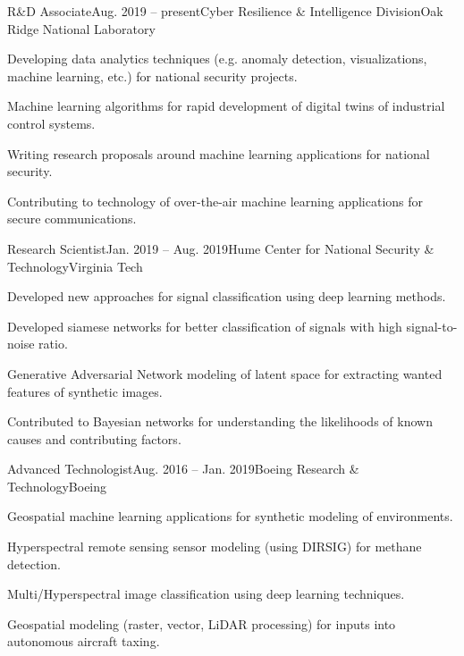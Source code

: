 \documentclass{tidycv} %
\begin{document}
\begin{cvresearches}
\begin{cvresearch}{R{\&}D Associate}{Aug. 2019 -- present}{Cyber Resilience \& Intelligence Division}{Oak Ridge National Laboratory}
 \item Developing data analytics techniques (e.g. anomaly detection, visualizations, machine learning, etc.) for national security projects.
 \item Machine learning algorithms for rapid development of digital twins of industrial control systems.
 \item Writing research proposals around machine learning applications for national security.
 \item Contributing to technology of over-the-air machine learning applications for secure communications. 
\end{cvresearch}
\begin{cvresearch}{Research Scientist}{Jan. 2019 -- Aug. 2019}{Hume Center for National Security \& Technology}{Virginia Tech}
 \item Developed new approaches for signal classification using deep learning methods. 
 \item Developed siamese networks for better classification of signals with high signal-to-noise ratio.
 \item Generative Adversarial Network modeling of latent space for extracting wanted features of synthetic images. 
 \item Contributed to Bayesian networks for understanding the likelihoods of known causes and contributing factors. 
\end{cvresearch}

\begin{cvresearch}{Advanced Technologist}{Aug. 2016 -- Jan. 2019}{Boeing Research \& Technology}{Boeing}
 \item Geospatial machine learning applications for synthetic modeling of environments.
 \item Hyperspectral remote sensing sensor modeling (using DIRSIG) for methane detection.
 \item Multi/Hyperspectral image classification using deep learning techniques. 
 \item Geospatial modeling (raster, vector, LiDAR processing) for inputs into autonomous aircraft taxing. 
\end{cvresearch}

\end{cvresearches}
\end{document}
